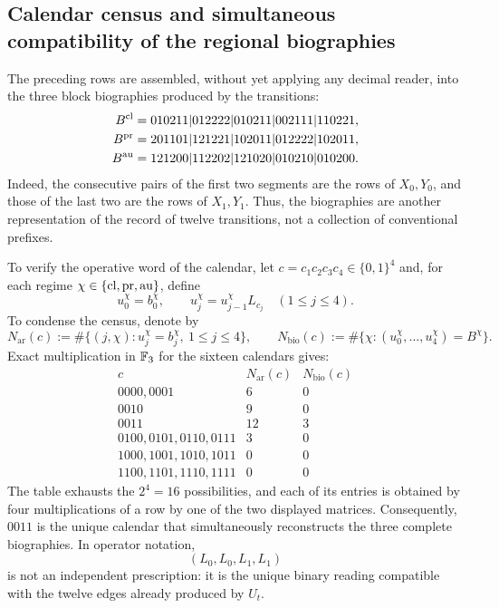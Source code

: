 \subsection{Calendar census and simultaneous compatibility of the regional biographies}
The preceding rows are assembled, without yet applying any decimal reader,
into the three block biographies produced by the transitions:
\begin{align}
 B^{\rm cl}
  &=010211|012222|010211|002111|110221,\notag\\
 B^{\rm pr}
  &=201101|121221|102011|012222|102011,
 \label{act21:eq:biografias-tpk-tres-caracteres}\\
 B^{\rm au}
  &=121200|112202|121020|010210|010200.\notag
\end{align}
Indeed, the consecutive pairs of the first two segments are the rows
of \(X_0,Y_0\), and those of the last two are the rows of \(X_1,Y_1\).
Thus, the biographies are another representation of the record of twelve
transitions, not a collection of conventional prefixes.

To verify the operative word of the calendar, let
\(c=c_1c_2c_3c_4\in\{0,1\}^4\) and, for each regime
\(\chi\in\{{\rm cl},{\rm pr},{\rm au}\}\), define
\[
 u_0^\chi=b_0^\chi,\qquad
 u_j^\chi=u_{j-1}^\chi L_{c_j}\quad(1\le j\le4).
\]
To condense the census, denote by
\[
 N_{\mathrm{ar}}(c):=
 \#\{(j,\chi):u_j^\chi=b_j^\chi,\ 1\le j\le4\},\qquad
 N_{\mathrm{bio}}(c):=
 \#\{\chi:(u_0^\chi,\ldots,u_4^\chi)=B^\chi\}.
\]
Exact multiplication in \(\mathbb F_3\) for the sixteen calendars gives:
\[
\begin{array}{c|c|c}
 c&N_{\mathrm{ar}}(c)&N_{\mathrm{bio}}(c)\\ \hline
0000,0001&6&0\\
0010&9&0\\
0011&12&3\\
0100,0101,0110,0111&3&0\\
1000,1001,1010,1011&0&0\\
1100,1101,1110,1111&0&0
\end{array}
\tag{D}
\label{act21:eq:censo-dieciseis-calendarios}
\]
The table exhausts the \(2^4=16\) possibilities, and each of its entries is
obtained by four multiplications of a row by one of the two displayed matrices.
Consequently, \(0011\) is the unique calendar that simultaneously reconstructs
the three complete biographies. In operator notation,
\begin{equation}
 (L_0,L_0,L_1,L_1)
 \label{act21:eq:calendario-0011-interno}
\end{equation}
is not an independent prescription: it is the unique binary reading compatible
with the twelve edges already produced by \(U_t\).

